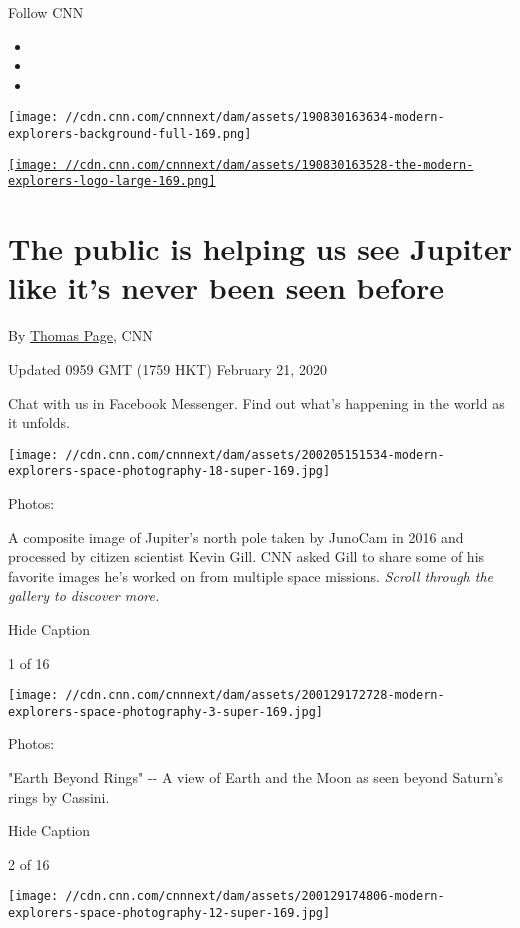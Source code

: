Follow CNN

\begin{itemize}
\item
\item
\item
\end{itemize}

\texttt{[image: //cdn.cnn.com/cnnnext/dam/assets/190830163634-modern-explorers-background-full-169.png]}

\href{/specials/world/the-modern-explorers}{\texttt{[image: //cdn.cnn.com/cnnnext/dam/assets/190830163528-the-modern-explorers-logo-large-169.png]}}

\hypertarget{the-public-is-helping-us-see-jupiter-like-its-never-been-seen-before}{%
\section{The public is helping us see Jupiter like it's never been seen
before}\label{the-public-is-helping-us-see-jupiter-like-its-never-been-seen-before}}

By \href{/profiles/thomas-page}{Thomas Page}, CNN

Updated 0959 GMT (1759 HKT) February 21, 2020

Chat with us in Facebook Messenger. Find out what's happening in the
world as it unfolds.

\texttt{[image: //cdn.cnn.com/cnnnext/dam/assets/200205151534-modern-explorers-space-photography-18-super-169.jpg]}

Photos:

A composite image of Jupiter's north pole taken by JunoCam in 2016 and
processed by citizen scientist Kevin Gill. CNN asked Gill to share some
of his favorite images he's worked on from multiple space missions.
\emph{Scroll through the gallery to discover more.}

Hide Caption

1 of 16

\texttt{[image: //cdn.cnn.com/cnnnext/dam/assets/200129172728-modern-explorers-space-photography-3-super-169.jpg]}

Photos:

"Earth Beyond Rings" -\/- A view of Earth and the Moon as seen beyond
Saturn's rings by Cassini.

Hide Caption

2 of 16

\texttt{[image: //cdn.cnn.com/cnnnext/dam/assets/200129174806-modern-explorers-space-photography-12-super-169.jpg]}

